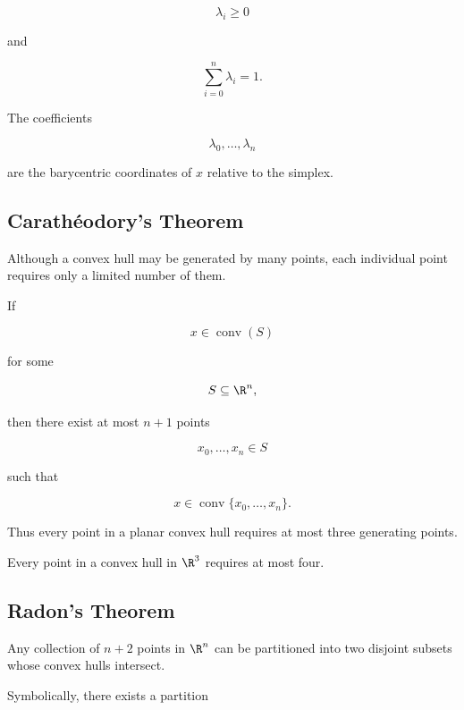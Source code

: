 \[
\lambda_i\geq0
\]

and

\[
\boxed{
\sum_{i=0}^{n}\lambda_i=1.
}
\]

The coefficients

\[
\lambda_0,\ldots,\lambda_n
\]

are the barycentric coordinates of \(x\) relative to the simplex.

\subsection{Carath\'eodory's Theorem}
\label{subsec:caratheodory-theorem}

Although a convex hull may be generated by many points, each individual
point requires only a limited number of them.

\begin{theorem}
If

\[
x\in\operatorname{conv}(S)
\]

for some

\[
S\subseteq\R^n,
\]

then there exist at most \(n+1\) points

\[
x_0,\ldots,x_n\in S
\]

such that

\[
\boxed{
x\in
\operatorname{conv}\{x_0,\ldots,x_n\}.
}
\]
\end{theorem}

Thus every point in a planar convex hull requires at most three generating
points.

Every point in a convex hull in \(\R^3\) requires at most four.

\subsection{Radon's Theorem}
\label{subsec:radon-theorem}

\begin{theorem}
Any collection of \(n+2\) points in \(\R^n\) can be partitioned into two
disjoint subsets whose convex hulls intersect.
\end{theorem}

Symbolically, there exists a partition

